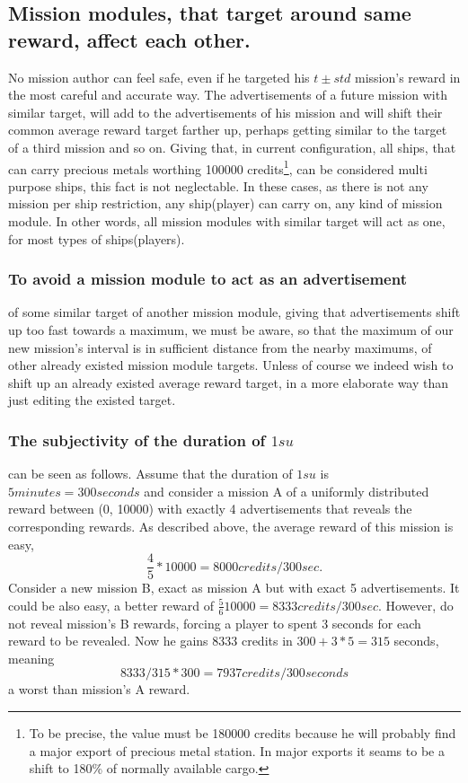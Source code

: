 \documentclass[]{article}
\begin{document}
\subsection{Mission modules, that target around same reward, affect each other.} No mission author can feel safe, even if he targeted his $t\pm std$ mission's reward in the most careful and accurate way. The advertisements of a future mission with similar target, will add to the advertisements of his mission and will shift their common average reward target farther up, perhaps getting similar to the target of a third mission and so on. Giving that, in current configuration, all ships, that can carry precious metals worthing 100000 credits\footnote{To be precise, the value must be 180000 credits because he will probably find a major export of precious metal station. In major exports it seams to be a shift to 180\% of normally available cargo.}, can be considered multi purpose ships, this fact is not neglectable. In these cases, as there is not any  mission per ship restriction, any ship(player) can carry on, any kind of mission module. In other words, all mission modules with similar target will act as one, for most types of ships(players).
\subsubsection{To avoid a mission module to act as an advertisement} of some similar target of another mission module, giving that advertisements shift up too fast towards a maximum, we must be aware, so that the maximum of our new mission's interval is in sufficient distance from the nearby maximums, of other already existed mission module targets. 
Unless of course we indeed wish to shift up an already existed average reward target, in a more elaborate way than just editing the existed target.
\subsubsection{The subjectivity of the duration of $1su$} can be seen as follows. Assume that the duration of $1su$ is $5 minutes=300seconds$ and consider a mission A of a uniformly distributed reward between (0, 10000) with exactly 4 advertisements that reveals the corresponding rewards. As described above, the average reward of this mission is easy, \[ \dfrac{4}{5}*10000=8000credits/300sec. \] Consider a new mission B, exact as mission A but with exact 5 advertisements. It could be  also easy, a better reward of $\frac{5}{6}10000=8333credits/300sec.$ However, do not reveal mission's B rewards, forcing a player to spent 3 seconds for each reward to be revealed. Now he gains 8333 credits in $300+3*5=315$ seconds, meaning \[8333/315*300=7937credits/300seconds\] a worst than mission's A reward.
\end{document}
